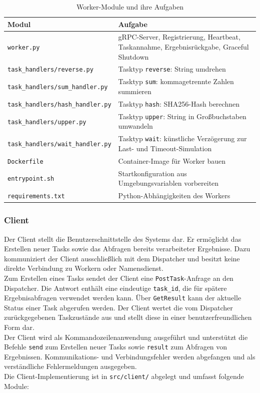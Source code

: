 \begin{table}[H]
	\centering
	\begin{tabular}{m{6.5cm} m{10cm}}
		\toprule
		\textbf{Modul} & \textbf{Aufgabe} \\
		\midrule
		\texttt{worker.py}              & gRPC-Server, Registrierung, Heartbeat, Taskannahme, Ergebnisrückgabe, Graceful Shutdown \\
		\texttt{task\_handlers/reverse.py}      & Tasktyp \texttt{reverse}: String umdrehen \\
		\texttt{task\_handlers/sum\_handler.py} & Tasktyp \texttt{sum}: kommagetrennte Zahlen summieren \\
		\texttt{task\_handlers/hash\_handler.py}& Tasktyp \texttt{hash}: SHA256-Hash berechnen \\
		\texttt{task\_handlers/upper.py}        & Tasktyp \texttt{upper}: String in Großbuchstaben umwandeln \\
		\texttt{task\_handlers/wait\_handler.py}& Tasktyp \texttt{wait}: künstliche Verzögerung zur Last- und Timeout-Simulation \\
		\texttt{Dockerfile}             & Container-Image für Worker bauen \\
		\texttt{entrypoint.sh}          & Startkonfiguration aus Umgebungsvariablen vorbereiten \\
		\texttt{requirements.txt}       & Python-Abhängigkeiten des Workers \\
		\bottomrule
	\end{tabular}
	\caption{Worker-Module und ihre Aufgaben}
\end{table}

\subsubsection*{Client}

Der Client stellt die Benutzerschnittstelle des Systems dar.
Er ermöglicht das Erstellen neuer Tasks sowie das Abfragen bereits
verarbeiteter Ergebnisse. Dazu kommuniziert der Client ausschließlich mit dem
Dispatcher und besitzt keine direkte Verbindung zu Workern oder Namensdienst.
\\
Zum Erstellen eines Tasks sendet der Client eine
\texttt{PostTask}-Anfrage an den Dispatcher. Die Antwort enthält eine
eindeutige \texttt{task\_id}, die für spätere Ergebnisabfragen verwendet
werden kann. Über \texttt{GetResult} kann der aktuelle Status einer Task
abgerufen werden. Der Client wertet die vom Dispatcher zurückgegebenen
Taskzustände aus und stellt diese in einer benutzerfreundlichen Form dar.
\\
Der Client wird als Kommandozeilenanwendung ausgeführt und unterstützt die
Befehle \texttt{send} zum Erstellen neuer Tasks sowie \texttt{result} zum
Abfragen von Ergebnissen. Kommunikations- und Verbindungsfehler werden
abgefangen und als verständliche Fehlermeldungen ausgegeben.
\\
Die Client-Implementierung ist in \texttt{src/client/} abgelegt und umfasst
folgende Module:

